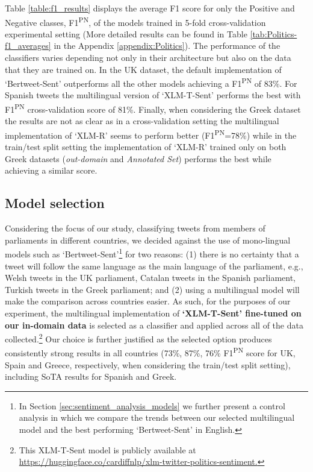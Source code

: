 Table \ref{table:f1_results} displays the average F1 score for only the Positive and Negative classes, F1\textsuperscript{PN}, of the models trained in 5-fold cross-validation experimental setting (More detailed results can be found in Table \ref{tab:Politics-f1_averages} in the Appendix \ref{appendix:Politics}).
The performance of the classifiers varies depending not only in their architecture but also on the data that they are trained on. In the UK dataset, the default implementation of `Bertweet-Sent' outperforms all the other models achieving a F1\textsuperscript{PN} of 83\%. For Spanish tweets the multilingual version of `XLM-T-Sent' performs the best with F1\textsuperscript{PN} cross-validation score of 81\%. Finally, when considering the Greek dataset the results are not as clear as in a cross-validation setting the multilingual implementation of `XLM-R' seems to perform better (F1\textsuperscript{PN}=78\%) while in the train/test split setting the implementation of `XLM-R' trained only on both Greek datasets (\textit{out-domain} and \textit{Annotated Set}) performs the best while achieving a similar score.




\subsection{Model selection}
\label{sec:modelselection}
Considering the focus of our study, classifying tweets from members of parliaments in different countries, we decided against the use of mono-lingual models such as `Bertweet-Sent'\footnote{In Section \ref{sec:sentiment_analysis_models} we further present a control analysis in which we compare the trends between our selected multilingual model and the best performing `Bertweet-Sent' in English.} for two reasons: (1) there is no certainty that a tweet will follow the same language as the main language of the parliament, e.g., Welsh tweets in the UK parliament, Catalan tweets in the Spanish parliament, Turkish tweets in the Greek parliament; and (2) using a multilingual model will make the comparison across countries easier.  As such, for the purposes of our experiment, the multilingual implementation of \textbf{`XLM-T-Sent' fine-tuned on our in-domain data} is selected as a classifier and applied across all of the data collected.\footnote{This XLM-T-Sent model is publicly available at \url{https://huggingface.co/cardiffnlp/xlm-twitter-politics-sentiment.}} Our choice is further justified as the selected option produces consistently strong results in all countries (73\%, 87\%, 76\%  F1\textsuperscript{PN} score for UK, Spain and Greece, respectively, when considering the train/test split setting), including \ac{SoTA} results for Spanish and Greek. 

